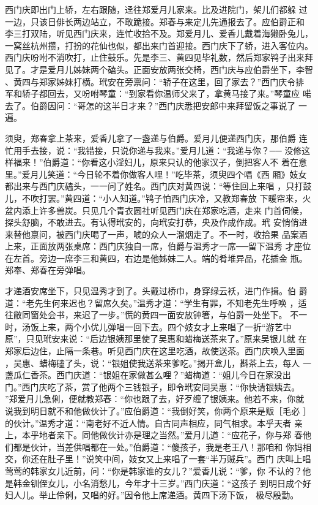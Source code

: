 西门庆即出门上轿，左右跟随，迳往郑爱月儿家来。比及进院门，架儿们都躲
过一边，只该日俳长两边站立，不敢跪接。郑春与来定儿先通报去了。应伯爵正和
李三打双陆，听见西门庆来，连忙收拾不及。郑爱月儿、爱香儿戴着海獭卧兔儿，
一窝丝杭州攒，打扮的花仙也似，都出来门首迎接。西门庆下了轿，进入客位内。
西门庆吩咐不消吹打，止住鼓乐。先是李三、黄四见毕礼数，然后郑家鸨子出来拜
见了。才是爱月儿姊妹两个磕头。正面安放两张交椅，西门庆与应伯爵坐下，李智
、黄四与郑家姊妹打横。玳安在旁禀问：“轿子在这里，回了家去？”西门庆令排
军和轿子都回去，又吩咐琴童：“到家看你温师父来了，拿黄马接了来。”琴童应
喏去了。伯爵因问：“哥怎的这半日才来？”西门庆悉把安郎中来拜留饭之事说了
一遍。

须臾，郑春拿上茶来，爱香儿拿了一盏递与伯爵。爱月儿便递西门庆，那伯爵
连忙用手去接，说：“我错接，只说你递与我来。”爱月儿道：“我递与你？──
没修这样福来！”伯爵道：“你看这小淫妇儿，原来只认的他家汉子，倒把客人不
着在意里。”爱月儿笑道：“今日轮不着你做客人哩！”吃毕茶，须臾四个唱《西
厢》妓女都出来与西门庆磕头，一一问了姓名。西门庆对黄四说：“等住回上来唱
，只打鼓儿，不吹打罢。”黄四道：“小人知道。”鸨子怕西门庆冷，又教郑春放
下暖帘来，火盆内添上许多兽炭。只见几个青衣圆社听见西门庆在郑家吃酒，走来
门首伺候，探头舒脑，不敢进去。有认得玳安的，向玳安打恭，央及作成作成。玳
安悄俏进来替他禀问，被西门庆喝了一声，唬的众人一溜烟走了。不一时，收拾果
品案酒上来，正面放两张桌席：西门庆独自一席，伯爵与温秀才一席──留下温秀
才座位在左首。旁边一席李三和黄四，右边是他姊妹二人。端的肴堆异品，花插金
瓶。郑奉、郑春在旁弹唱。

才递酒安席坐下，只见温秀才到了。头戴过桥巾，身穿绿云袄，进门作揖。伯
爵道：“老先生何来迟也？留席久矣。”温秀才道：“学生有罪，不知老先生呼唤
，适往敝同窗处会书，来迟了一步。”慌的黄四一面安放钟箸，与伯爵一处坐下。
不一时，汤饭上来，两个小优儿弹唱一回下去。四个妓女才上来唱了一折“游艺中
原”，只见玳安来说：“后边银姨那里使了吴惠和蜡梅送茶来了。”原来吴银儿就
在郑家后边住，止隔一条巷。听见西门庆在这里吃酒，故使送茶。西门庆唤入里面
，吴惠、蜡梅磕了头，说：“银姐使我送茶来爹吃。”揭开盒儿，斟茶上去，每人
一盏瓜仁香茶。西门庆道：“银姐在家做甚么哩？”蜡梅道：“姐儿今日在家没出
门。”西门庆吃了茶，赏了他两个三钱银子，即令玳安同吴惠：“你快请银姨去。
”郑爱月儿急俐，便就教郑春：“你也跟了去，好歹缠了银姨来。他若不来，你就
说我到明日就不和他做伙计了。”应伯爵道：“我倒好笑，你两个原来是贩［毛必
］的伙计。”温秀才道：“南老好不近人情。自古同声相应，同气相求。本乎天者
亲上，本乎地者亲下。同他做伙计亦是理之当然。”爱月儿道：“应花子，你与郑
春他们都是伙计，当差供唱都在一处。”伯爵道：“傻孩子，我是老王八！那咱和
你妈相交，你还在肚子里！”说笑中间，妓女又上来唱了一套“半万贼兵”。西门
庆叫上唱莺莺的韩家女儿近前，问：“你是韩家谁的女儿？”爱香儿说：“爹，你
不认的？他是韩金钏侄女儿，小名消愁儿，今年才十三岁。”西门庆道：“这孩子
到明日成个好妇人儿。举止伶俐，又唱的好。”因令他上席递酒。黄四下汤下饭，
极尽殷勤。

